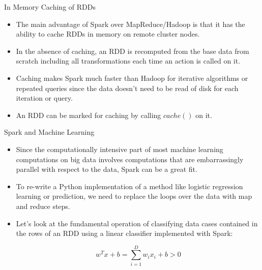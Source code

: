 \documentclass[serif,xcolor=pdftex,dvipsnames,table,hyperref={bookmarks=false,breaklinks}]{beamer}
\begin{document}
\begin{frame}[t]{In Memory Caching of RDDs}

\begin{itemize}

\item The main advantage of Spark over MapReduce/Hadoop is that
it has the ability to cache RDDs in memory on remote cluster nodes.

\pause\item In the absence of caching, an RDD is recomputed from the
base data from scratch including all transformations each time an action
is called on it.

\pause\item Caching makes Spark much faster than Hadoop for iterative algorithms
or repeated queries since the data doesn't need to be read of disk for each
iteration or query.

\pause\item An RDD can be marked for caching by calling $cache()$ on it. 


\end{itemize}

\end{frame}


\begin{frame}[t]{Spark and Machine Learning}

\begin{itemize}

\item Since the computationally intensive part of most machine learning
computations on big data involves computations that are embarrassingly parallel
with respect to the data, Spark can be a great fit.

\pause \item To re-write a Python implementation of a  method like 
logistic regression learning or prediction, we need to replace the loops 
over the data with map and reduce steps.

\pause \item Let's look at the fundamental operation of classifying data cases
contained in the rows of an RDD using a linear classifier implemented with Spark:

$$w^Tx + b = \sum_{i=1}^D w_ix_i +b >0$$

\end{itemize}

\end{frame}
\end{document}
